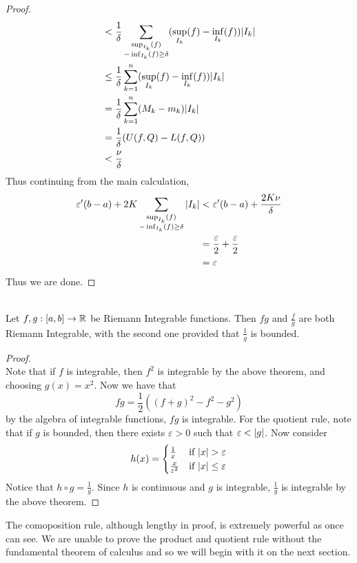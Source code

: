 \documentclass[a4paper]{article}
\begin{document}
\begin{thm}{}{}
\begin{proof}
\begin{align*}
&<\frac{1}{\delta}\sum_{\substack{\sup_{I_k}(f)\\-\inf_{I_k}(f)\geq\delta}}(\sup_{I_k}(f)-\inf_{I_k}(f))\abs{I_k}\\
&\leq\frac{1}{\delta}\sum_{k=1}^n(\sup_{I_k}(f)-\inf_{I_k}(f))\abs{I_k}\\
&=\frac{1}{\delta}\sum_{k=1}^n(M_k-m_k)\abs{I_k}\\
&=\frac{1}{\delta}(U(f,Q)-L(f,Q))\\
&<\frac{\nu}{\delta}
\end{align*}
Thus continuing from the main calculation, 
\begin{align*}
\varepsilon'(b-a)+2K\sum_{\substack{\sup_{I_k}(f)\\-\inf_{I_k}(f)\geq\delta}}\abs{I_k}&<\varepsilon'(b-a)+\frac{2K\nu}{\delta}\\
&=\frac{\varepsilon}{2}+\frac{\varepsilon}{2}\\
&=\varepsilon
\end{align*}
Thus we are done. 
\end{proof}
\end{thm}

\begin{thm}{}{}\\ Let $f,g:[a,b]\to\mathbb{R}$ be Riemann Integrable functions. Then $fg$ and $\frac{f}{g}$ are both Riemann Integrable, with the second one provided that $\frac{1}{g}$ is bounded. 
\begin{proof}\\ Note that if $f$ is integrable, then $f^2$ is integrable by the above theorem, and choosing $g(x)=x^2$. Now we have that $$fg=\frac{1}{2}((f+g)^2-f^2-g^2)$$ by the algebra of integrable functions, $fg$ is integrable. For the quotient rule, note that if $g$ is bounded, then there exists $\varepsilon>0$ such that $\varepsilon<\abs{g}$. Now consider $$h(x)=\begin{cases}
\frac{1}{x} & \text{if $\abs{x}>\varepsilon$}\\
\frac{x}{\varepsilon^2} & \text{if $\abs{x}\leq\varepsilon$}
\end{cases}$$
Notice that $h\circ g=\frac{1}{g}$. Since $h$ is continuous and $g$ is integrable, $\frac{1}{g}$ is integrable by the above theorem. 
\end{proof}
\end{thm}

The comoposition rule, although lengthy in proof, is extremely powerful as once can see. We are unable to prove the product and quotient rule without the fundamental theorem of calculus and so we will begin with it on the next section. 
\end{document}
